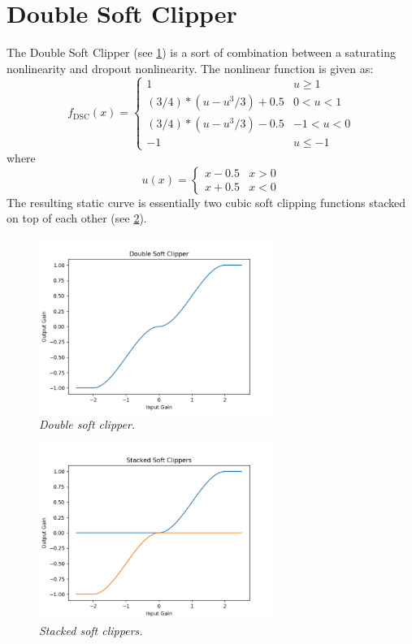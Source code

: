 \documentclass[twoside,a4paper]{article}
\begin{document}
\section{Double Soft Clipper} \label{sec:DSC}
%
The Double Soft Clipper (see \cref{DSC}) is a sort of
combination between a saturating nonlinearity and dropout
nonlinearity. The nonlinear function is given as:
%
\begin{equation}
    f_{\text{DSC}}(x) = \begin{cases}
        1 & u \geq 1 \\
        (3/4) * (u - u^3/3) + 0.5 & 0 < u < 1 \\
        (3/4) * (u - u^3/3) - 0.5 & -1 < u < 0 \\
        -1 & u \leq -1
    \end{cases}
    \label{eq:double-soft-clip}
\end{equation}
%
where
%
\begin{equation}
    u(x) = \begin{cases}
    x - 0.5 & x > 0 \\
    x + 0.5 & x < 0
    \end{cases}
    \label{eq:double-soft-clip_u}
\end{equation}
%
The resulting static curve is essentially two cubic soft
clipping functions stacked on top of each other (see \cref{DSC-stack}).
%
\begin{figure}[!htb]
    \center
    \includegraphics[width=3in]{../DoubleSoftClipper/Pics/Double.png}
    \caption{\label{DSC}{\it Double soft clipper.}}
\end{figure}
%
\begin{figure}[!htb]
    \center
    \includegraphics[width=3in]{../DoubleSoftClipper/Pics/stacked.png}
    \caption{\label{DSC-stack}{\it Stacked soft clippers.}}
\end{figure}
\end{document}
